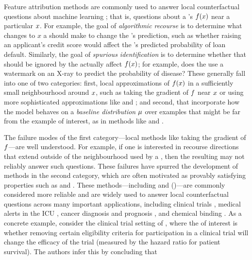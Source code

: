 %



Feature attribution methods are commonly used to answer local counterfactual questions about machine learning \modelnames{}; that is, questions about a \modelname{}'s \behaviourname{} $f(x)$ near a particular \obsname{} $x$.
For example, 
the goal of \emph{algorithmic recourse} is to determine what changes to $x$ a \pracname{} should make
%
to change the \modelname{}'s prediction,
such as whether raising an applicant's credit score would affect the \modelname{}'s predicted probability of loan default. 
Similarly, the goal of \emph{spurious \covname{} identification} is to determine whether \covnames{} that should be ignored by the \modelname{} actually affect $f(x)$; for example, does the \modelname{} use a watermark on an X-ray to predict the probability of disease?
These \fieldmethodnames{} generally fall into one of two categories:
first, local approximations of $f(x)$ in a sufficiently small neighbourhood around $x$, such as taking the gradient of $f$ near $x$ \citep{simonyan13gradient} or using more sophisticated approximations like \smoothgrad{} \citep{smilkov17smoothgrad} and \lime{} \citep{ribeiro16lime};
and second, \methodnames{} that incorporate how the model behaves on a \emph{baseline distribution} $\mu$ over examples that might be far from the example of interest, as in methods like \shap{} \citep{lundberg17shapley} and \intgrad{} \citep{sundararajan17integrated}.

The failure modes of the first category---local methods like taking the gradient of $f$---are well understood. 
For example, if one is interested in recourse directions that extend outside of the neighbourhood used by a \localname{} \methodname{}, then the resulting \covname{} \attname{} may not reliably answer such questions.
These failures have spurred the development of methods in the second category, which are often motivated as provably satisfying properties such as \completenames{} and \additivenames{}. These methods---including \shap{} and \intgrad{} (\intgradshort{})---are commonly considered more reliable and are widely used to answer local counterfactual questions across many important applications,
%
%
including clinical trials \citep{liu21oncology},
medical alerts in the ICU \citep{zaeri18icus},
cancer diagnosis \citep{zhou21prostate} and prognosis \citep{roder21molecular}, and chemical binding \citep{mccloskey19attribution}.
As a concrete example, consider the clinical trial setting of \citet{liu21oncology}, where the \countmodbehaviourname{} of interest is whether removing certain eligibility criteria for participation in a clinical trial will change the efficacy of the trial (measured by the hazard ratio for patient survival).
The authors infer this \countmodbehaviourname{} by concluding that 

